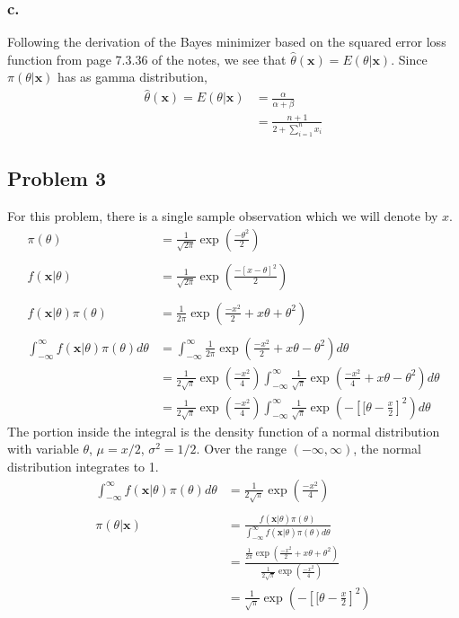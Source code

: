\documentclass{article}
\begin{document}
\subsubsection*{c.}

Following the derivation of the Bayes minimizer based on the squared error loss function from page 7.3.36 of the notes, we see that $\hat{\theta}(\mathbf{x}) = E(\theta|\mathbf{x})$.
Since $\pi(\theta|\mathbf{x})$ has as gamma distribution, 
\begin{align*}
\hat{\theta}(\mathbf{x}) = E(\theta|\mathbf{x}) &= \frac{\alpha}{\alpha + \beta} \\
&= \frac{n+1}{2+\sum_{i=1}^n x_i}
\end{align*}
\subsection*{Problem 3}
For this problem, there is a single sample observation which we will denote by $x$.
\begin{align*}
\pi(\theta) &= \frac{1}{\sqrt{2\pi}}\exp\left(\frac{-\theta^2}{2}\right) \\ \\ 
f(\mathbf{x}|\theta) &= \frac{1}{\sqrt{2\pi}}\exp\left(\frac{-[x-\theta]^2}{2}\right) \\ \\ 
f(\mathbf{x}|\theta)\pi(\theta) &= \frac{1}{2\pi}\exp\left(\frac{-x^2}{2}+x\theta+\theta^2\right) \\ \\
\int_{-\infty}^\infty f(\mathbf{x}|\theta)\pi(\theta) d\theta &= \int_{-\infty}^\infty\frac{1}{2\pi}\exp\left(\frac{-x^2}{2}+x\theta-\theta^2\right)d\theta \\
&=\frac{1}{2\sqrt{\pi}}\exp\left(\frac{-x^2}{4}\right)\int_{-\infty}^\infty \frac{1}{\sqrt{\pi}}\exp\left(\frac{-x^2}{4}+x\theta-\theta^2\right)d\theta \\ 
&=\frac{1}{2\sqrt{\pi}}\exp\left(\frac{-x^2}{4}\right)\int_{-\infty}^\infty \frac{1}{\sqrt{\pi}}\exp\left(-\left[[\theta-\frac{x}{2}\right]^2\right) d\theta
\end{align*}
The portion inside the integral is the density function of a normal distribution with variable $\theta$, $\mu = x/2$, $\sigma^2 = 1/2$. Over the range $(-\infty, \infty)$, the normal distribution integrates to 1. 
\begin{align*}
\int_{-\infty}^\infty f(\mathbf{x}|\theta)\pi(\theta) d\theta &= \frac{1}{2\sqrt{\pi}}\exp\left(\frac{-x^2}{4}\right) \\ \\
\pi(\theta|\mathbf{x}) &= \frac{f(\mathbf{x}|\theta)\pi(\theta)}{\int_{-\infty}^\infty f(\mathbf{x}|\theta)\pi(\theta) d\theta} \\
&= \frac{\frac{1}{2\pi}\exp\left(\frac{-x^2}{2}+x\theta+\theta^2\right)}{\frac{1}{2\sqrt{\pi}}\exp\left(\frac{-x^2}{4}\right)} \\
&=\frac{1}{\sqrt{\pi}}\exp\left(-\left[[\theta-\frac{x}{2}\right]^2\right)
\end{align*}
\end{document}
